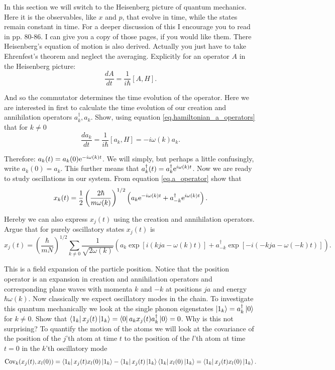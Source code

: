 \documentclass[10pt]{article}
\def\te{{\rm e}}
\begin{document}
In this section we will switch to the Heisenberg picture of quantum mechanics. Here it is the observables, like $x$ and $p$, that evolve in time, while the states remain constant in time. For a deeper discussion of this I encourage you to read in \cite{Sakurai} pp.  80-86. I can give you a copy of those pages, if you would like them. There Heisenberg's equation of motion is also derived. Actually you just have to take Ehrenfest's theorem and neglect the averaging. Explicitly for an operator $A$ in the Heisenberg picture:
 \begin{equation}
 \frac{d A}{dt} = \frac{1}{i\hbar}[A,H]. 
 \end{equation}
 
 And so the commutator determines the time evolution of the operator. Here we are interested in first to calculate the time evolution of our creation and annihilation operators $a_k^\dagger, a_k$. Show, using equation \eqref{eq.hamiltonian_a_operators} that for $k\neq 0$
 \begin{equation}
 \frac{d a_k}{dt} = \frac{1}{i\hbar}[a_k,H] = -i\omega(k)a_k.  
 \end{equation}
 
 Therefore: $a_k(t) = a_k(0)\te^{-i\omega(k)t}$. We will simply, but perhaps a little confusingly, write $a_k(0)=a_k$. This further means that $a_k^\dagger(t)=a_k^\dagger \te^{i\omega(k)t}$. Now we are ready to study oscillations in our system. From equation \eqref{eq.a_operator} show that
 \begin{equation}
 x_k(t) = \frac{1}{2}\left(\frac{2\hbar}{m\omega(k)}\right)^{1/2}\left(a_k\te^{-i\omega(k)t} + a_{-k}^\dagger\te^{i\omega(k)t}\right). 
 \end{equation}
 
Hereby we can also express $x_j(t)$ using the creation and annihilation operators. Argue that for purely oscillatory states $x_j(t)$ is
\begin{equation}
x_j(t)=\left(\frac{\hbar}{mN}\right)^{1/2}\sum_{k\neq 0}\frac{1}{\sqrt{2\omega(k)}}\left( a_k\exp\left[i(kja-\omega(k)t)\right]+a_{-k}^\dagger\exp\left[-i(-kja-\omega(-k)t)\right] \right).
 \label{eq.x_field_expansion}
 \end{equation}
 
This is a field expansion of the particle position. Notice that the position operator is an expansion in creation and annihilation operators and corresponding plane waves with momenta $k$ and $-k$ at positions $ja$ and energy $\hbar\omega(k)$. Now classically we expect oscillatory modes in the chain. To investigate this quantum mechanically we look at the single phonon eigenstates $\ket{1_k}=a_k^\dagger\ket{0}$ for $k\neq 0$. Show that $\bra{1_k}x_j(t)\ket{1_k} = \bra{0}a_kx_j(t)a_k^\dagger\ket{0}=0$. Why is this not surprising?
To quantify the motion of the atoms we will look at the covariance of the position of the $j$'th atom at time $t$ to the position of the $l$'th atom at time $t=0$ in the $k$'th oscillatory mode 
\begin{equation}
\text{Cov}_k(x_j(t),x_l(0)) = \bra{1_k} x_j(t)x_l(0)\ket{1_k} - \bra{1_k} x_j(t)\ket{1_k}\bra{1_k} x_l(0)\ket{1_k} =  \bra{1_k} x_j(t)x_l(0)\ket{1_k}. 
\end{equation}
\end{document}
